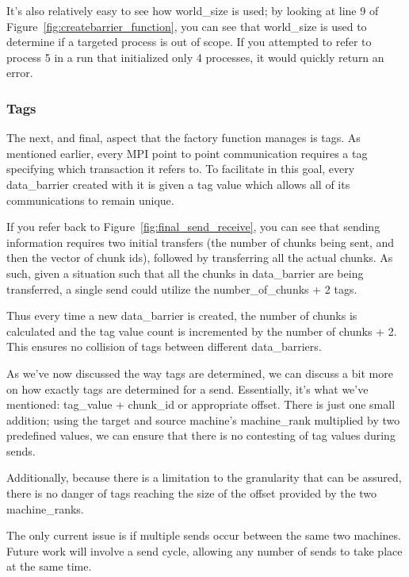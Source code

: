 \documentclass[../thesis.tex]{subfiles}
\begin{document}
        It's also relatively easy to see how world\_size is used; by looking at line 9 of Figure~\ref{fig:createbarrier_function}, you can see that world\_size is used to determine if a targeted process is out of scope. If you attempted to refer to process 5 in a run that initialized only 4 processes, it would quickly return an error.

    \subsubsection{Tags} %
    \label{ssub:tags}
        The next, and final, aspect that the factory function manages is tags. As mentioned earlier, every MPI point to point communication requires a tag specifying which transaction it refers to. To facilitate in this goal, every data\_barrier created with it is given a tag value which allows all of its communications to remain unique.

        If you refer back to Figure~\ref{fig:final_send_receive}, you can see that sending information requires two initial transfers (the number of chunks being sent, and then the vector of chunk ids), followed by transferring all the actual chunks. As such, given a situation such that all the chunks in data\_barrier are being transferred, a single send could utilize the number\_of\_chunks + 2 tags.

        Thus every time a new data\_barrier is created, the number of chunks is calculated and the tag value count is incremented by the number of chunks + 2. This ensures no collision of tags between different data\_barriers.

        As we've now discussed the way tags are determined, we can discuss a bit more on how exactly tags are determined for a send. Essentially, it's what we've mentioned: tag\_value + chunk\_id or appropriate offset. There is just one small addition; using the target and source machine's machine\_rank multiplied by two predefined values, we can ensure that there is no contesting of tag values during sends. 
        
        Additionally, because there is a limitation to the granularity that can be assured, there is no danger of tags reaching the size of the offset provided by the two machine\_ranks.

        The only current issue is if multiple sends occur between the same two machines. Future work will involve a send cycle, allowing any number of sends to take place at the same time.
\end{document}
